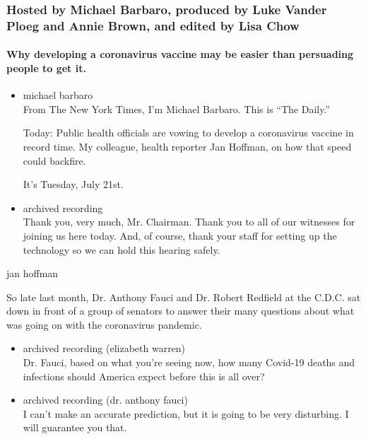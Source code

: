 \hypertarget{hosted-by-michael-barbaro-produced-by-luke-vander-ploeg-and-annie-brown-and-edited-by-lisa-chow}{%
\subsubsection{Hosted by Michael Barbaro, produced by Luke Vander Ploeg
and Annie Brown, and edited by Lisa
Chow}\label{hosted-by-michael-barbaro-produced-by-luke-vander-ploeg-and-annie-brown-and-edited-by-lisa-chow}}

\hypertarget{why-developing-a-coronavirus-vaccine-may-be-easier-than-persuading-people-to-get-it}{%
\paragraph{Why developing a coronavirus vaccine may be easier than
persuading people to get
it.}\label{why-developing-a-coronavirus-vaccine-may-be-easier-than-persuading-people-to-get-it}}

\begin{itemize}
\item
  michael barbaro\\
  From The New York Times, I'm Michael Barbaro. This is ``The Daily.''

  Today: Public health officials are vowing to develop a coronavirus
  vaccine in record time. My colleague, health reporter Jan Hoffman, on
  how that speed could backfire.

  It's Tuesday, July 21st.
\item
  archived recording\\
  Thank you, very much, Mr. Chairman. Thank you to all of our witnesses
  for joining us here today. And, of course, thank your staff for
  setting up the technology so we can hold this hearing safely.
\end{itemize}

jan hoffman

So late last month, Dr. Anthony Fauci and Dr. Robert Redfield at the
C.D.C. sat down in front of a group of senators to answer their many
questions about what was going on with the coronavirus pandemic.

\begin{itemize}
\item
  archived recording (elizabeth warren)\\
  Dr. Fauci, based on what you're seeing now, how many Covid-19 deaths
  and infections should America expect before this is all over?
\item
  archived recording (dr. anthony fauci)\\
  I can't make an accurate prediction, but it is going to be very
  disturbing. I will guarantee you that.
\end{itemize}

